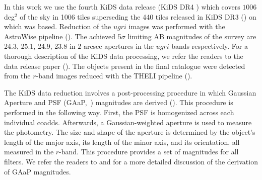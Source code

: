 \documentclass{aa}
\numberwithin{equation}{section}
\newcommand{\mb}{\textcolor{brown}}
\begin{document}
In this work we use the fourth KiDS data release (KiDS DR4 \citealt{kuijken2019}) which covers $1006$ deg$^{2}$ of the sky in 1006 tiles superseding the 440 tiles released in KiDS DR3 (\citealt{kids_dr3}) on which \citet{vakili2019} was based. Reduction of the $ugri$ images was performed with the AstroWise pipeline (\citealt{astrowise}).  
The achieved 5$\sigma$ limiting AB magnitudes of the survey are 24.3, 25.1, 24.9, 23.8 in $2$ arcsec apertures in the $ugri$ bands respectively. For a thorough description of the KiDS data processing, we refer the readers to the data release paper (\citealt{kuijken2019}).
The	objects present in the final catalogue were detected from the $r$-band images reduced with the THELI pipeline (\citealt{theli2, theli1}).	



The KiDS data reduction involves a post-processing procedure in which Gaussian Aperture and PSF (GAaP,~\citealt{gaap}) magnitudes are derived (\citealt{kuijken2015}). This procedure is performed in the following way. First, the PSF is homogenized across each individual coadds. Afterwards, a Gaussian-weighted aperture is used to measure the photometry. The size and shape of the aperture is determined by the object's length of the major axis, its length of the minor axis, and its orientation, all measured in the $r$-band. This procedure provides a set of magnitudes for all filters. We refer the readers to \citet{kuijken2015} and \citet{kids_dr3} for a more detailed discussion of the derivation of GAaP magnitudes.
\end{document}
